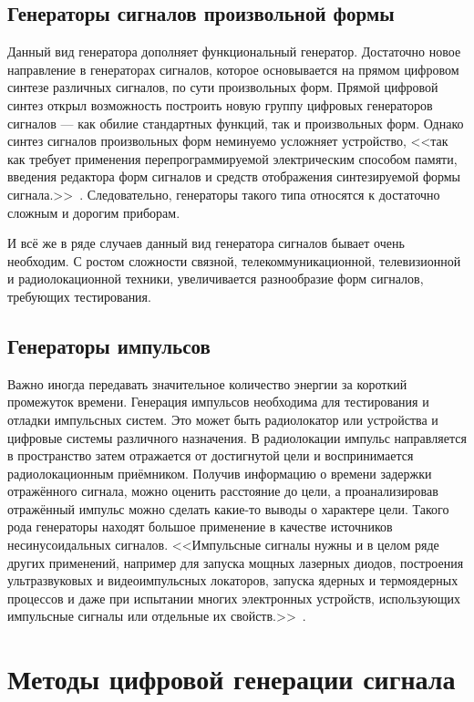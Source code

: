 \subsection{Генераторы сигналов произвольной формы}
Данный вид генератора дополняет функциональный генератор. Достаточно новое направление в генераторах сигналов, которое основывается на прямом цифровом синтезе различных сигналов, по сути произвольных форм. Прямой цифровой синтез открыл возможность построить новую группу цифровых генераторов сигналов --- как обилие стандартных функций, так и произвольных форм. Однако синтез сигналов произвольных форм неминуемо усложняет устройство, <<так как требует применения перепрограммируемой электрическим способом памяти, введения редактора форм сигналов и средств отображения синтезируемой формы сигнала.>>~\cite{dgs}. Следовательно, генераторы такого типа относятся к достаточно сложным и дорогим приборам.

И всё же в ряде случаев данный вид генератора сигналов бывает очень необходим. С ростом сложности связной, телекоммуникационной, телевизионной и радиолокационной техники, увеличивается разнообразие форм сигналов, требующих тестирования.


\subsection{Генераторы импульсов}
Важно иногда передавать значительное количество энергии за короткий промежуток времени. Генерация импульсов необходима для тестирования и отладки импульсных систем. Это может быть радиолокатор или устройства и цифровые системы различного назначения. В радиолокации импульс направляется в пространство затем отражается от достигнутой цели и воспринимается радиолокационным приёмником. Получив информацию о времени задержки отражённого сигнала, можно оценить расстояние до цели, а проанализировав отражённый импульс можно сделать какие-то выводы о характере цели. Такого рода генераторы находят большое применение в качестве источников несинусоидальных сигналов. <<Импульсные сигналы нужны и в целом ряде других применений, например для запуска мощных лазерных диодов, построения ультразвуковых и видеоимпульсных локаторов, запуска ядерных и термоядерных процессов и даже при испытании многих электронных устройств, использующих импульсные сигналы или отдельные их свойств.>>~\cite{dgs}.


\section{Методы цифровой генерации сигнала}

